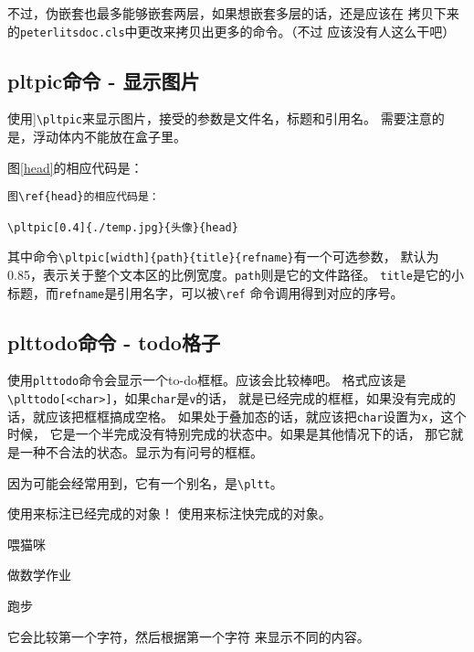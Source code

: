 \documentclass{peterlitsdoc}
\newcommand{\vb}{\verb}
\begin{document}
不过，伪嵌套也最多能够嵌套两层，如果想嵌套多层的话，还是应该在
拷贝下来的\vb|peterlitsdoc.cls|中更改来拷贝出更多的命令。（不过
应该没有人这么干吧）


\subsection{pltpic命令 - 显示图片}

使用]\vb|\pltpic|来显示图片，接受的参数是文件名，标题和引用名。
需要注意的是，浮动体内不能放在盒子里。

图\ref{head}的相应代码是：

\begin{lstlisting}
图\ref{head}的相应代码是：

\pltpic[0.4]{./temp.jpg}{头像}{head}
\end{lstlisting}


其中命令\vb|\pltpic[width]{path}{title}{refname}|有一个可选参数，
默认为0.85，表示关于整个文本区的比例宽度。\vb|path|则是它的文件路径。
\vb|title|是它的小标题，而\vb|refname|是引用名字，可以被\vb|\ref|
命令调用得到对应的序号。


\subsection{plttodo命令 - todo格子}

使用\vb|plttodo|命令会显示一个to-do框框。应该会比较棒吧。
格式应该是\vb|\plttodo[<char>]|，如果\vb|char|是\vb|v|的话，
就是已经完成的框框，如果没有完成的话，就应该把框框搞成空格。
如果处于叠加态的话，就应该把\vb|char|设置为\vb|x|，这个时候，
它是一个半完成没有特别完成的状态中。如果是其他情况下的话，
那它就是一种不合法的状态。显示为有问号的框框。

因为可能会经常用到，它有一个别名，是\vb|\pltt|。

\begin{pltrun}
使用\plttodo[v]来标注已经完成的对象！
使用\plttodo[x]来标注快完成的对象。

\plttodo[v]喂猫咪

\plttodo[x]做数学作业

\plttodo[ ]跑步

它会比较第一个字符，然后根据第一个字符
来显示不同的内容。

\pltt[]   \pltt[x]  \pltt[  ] \pltt[ ]
\pltt[aa] \pltt[ a] \pltt[v]  \pltt[vv]
\pltt[ v]
\end{pltrun}
\end{document}
